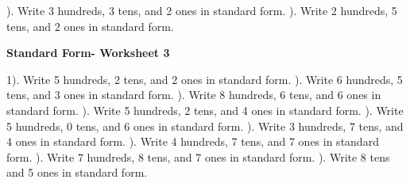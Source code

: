 \documentclass{article}%
\begin{document}
\newline%
\newline%
). Write 3 hundreds, 3 tens, and 2 ones in standard form.%
\newline%
\newline%
). Write 2 hundreds, 5 tens, and 2 ones in standard form.%
\newline%
\newline%
\newline%
\pagebreak%
\large%
\begin{center}%
\textbf{Standard Form- Worksheet 3}%
\newline%
\end{center} \normalsize%
1). Write 5 hundreds, 2 tens, and 2 ones in standard form.%
\newline%
\newline%
). Write 6 hundreds, 5 tens, and 3 ones in standard form.%
\newline%
\newline%
). Write 8 hundreds, 6 tens, and 6 ones in standard form.%
\newline%
\newline%
). Write 5 hundreds, 2 tens, and 4 ones in standard form.%
\newline%
\newline%
). Write 5 hundreds, 0 tens, and 6 ones in standard form.%
\newline%
\newline%
). Write 3 hundreds, 7 tens, and 4 ones in standard form.%
\newline%
\newline%
). Write 4 hundreds, 7 tens, and 7 ones in standard form.%
\newline%
\newline%
). Write 7 hundreds, 8 tens, and 7 ones in standard form.%
\newline%
\newline%
). Write 8 tens and 5 ones in standard form.%
\newline%
\newline%
\end{document}
